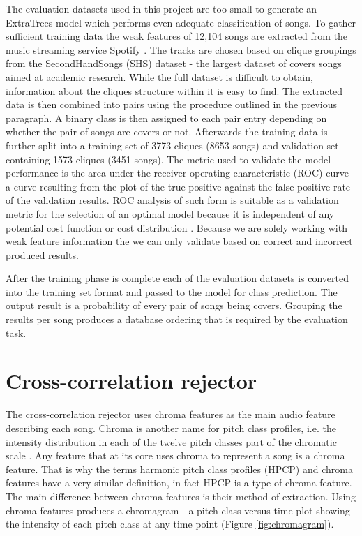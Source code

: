The evaluation datasets used in this project are too small to generate an
ExtraTrees model which performs even adequate classification of songs. To gather
sufficient training data the weak features of 12,104 songs are extracted from
the music streaming service Spotify \cite{spotify}. The tracks are chosen based
on clique groupings from the SecondHandSongs (SHS) \cite{shs} dataset - the
largest dataset of covers songs aimed at academic research. While the full
dataset is difficult to obtain, information about the cliques structure within
it is easy to find. The extracted data is then combined into pairs using the
procedure outlined in the previous paragraph. A binary class is then assigned to
each pair entry depending on whether the pair of songs are covers or not.
Afterwards the training data is further split into a training set of 3773
cliques (8653 songs) and validation set containing 1573 cliques (3451 songs).
The metric used to validate the model performance is the area under the receiver
operating characteristic (ROC) curve - a curve resulting from the plot of the
true positive against the false positive rate of the validation results. ROC
analysis of such form is suitable as a validation metric for the selection of an
optimal model because it is independent of any potential cost function or cost
distribution \cite{wiki:roc}. Because we are solely working with weak feature
information the we can only validate based on correct and incorrect produced results.

After the training phase is complete each of the evaluation datasets is
converted into the training set format and passed to the model for class
prediction. The output result is a probability of every pair of songs being
covers. Grouping the results per song produces a database ordering that is
required by the evaluation task.

\section{Cross-correlation rejector} 
\label{sec:weakfeatures}
The cross-correlation rejector uses chroma features as the main audio feature
describing each song. Chroma is another name for pitch class profiles, i.e. the
intensity distribution in each of the twelve pitch classes part of the chromatic
scale \cite{fujishima1999real}. Any feature that at its core uses chroma to
represent a song is a chroma feature. That is why the terms harmonic pitch class
profiles (HPCP) and chroma features have a very similar definition, in fact
HPCP is a type of chroma feature. The main difference between chroma features is
their method of extraction. Using chroma features produces a chromagram - a
pitch class versus time plot showing the intensity of each pitch class at any
time point (Figure \ref{fig:chromagram}).

